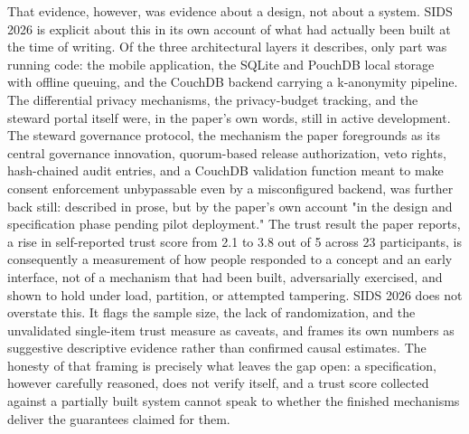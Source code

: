 That evidence, however, was evidence about a design, not about a system. SIDS 2026 is explicit about this in its own account of what had actually been built at the time of writing. Of the three architectural layers it describes, only part was running code: the mobile application, the SQLite and PouchDB local storage with offline queuing, and the CouchDB backend carrying a k-anonymity pipeline. The differential privacy mechanisms, the privacy-budget tracking, and the steward portal itself were, in the paper's own words, still in active development. The steward governance protocol, the mechanism the paper foregrounds as its central governance innovation, quorum-based release authorization, veto rights, hash-chained audit entries, and a CouchDB validation function meant to make consent enforcement unbypassable even by a misconfigured backend, was further back still: described in prose, but by the paper's own account "in the design and specification phase pending pilot deployment." The trust result the paper reports, a rise in self-reported trust score from 2.1 to 3.8 out of 5 across 23 participants, is consequently a measurement of how people responded to a concept and an early interface, not of a mechanism that had been built, adversarially exercised, and shown to hold under load, partition, or attempted tampering. SIDS 2026 does not overstate this. It flags the sample size, the lack of randomization, and the unvalidated single-item trust measure as caveats, and frames its own numbers as suggestive descriptive evidence rather than confirmed causal estimates. The honesty of that framing is precisely what leaves the gap open: a specification, however carefully reasoned, does not verify itself, and a trust score collected against a partially built system cannot speak to whether the finished mechanisms deliver the guarantees claimed for them.

